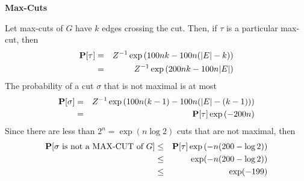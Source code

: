 \documentclass[11pt]{article} \usepackage{amssymb}
\begin{document}
{\bf Max-Cuts}

Let max-cuts of $G$ have $k$ edges crossing the cut. Then, if $\tau$ is a particular
max-cut, then
\begin{eqnarray*}
  \P[\tau]&=&Z^{-1}\exp\left(100nk-100n(|E|-k)\right)
  \\ &=& Z^{-1}\exp\left(200nk-100n|E|\right)
\end{eqnarray*}
The probability of a cut $\sigma$ that is not maximal is at most
\begin{eqnarray*}
  \P[\sigma]&=&Z^{-1}\exp\left(100n(k-1)-100n(|E|-(k-1))\right)
  \\ &=& \P[\tau]\exp\left(-200n\right)
\end{eqnarray*}
Since there are less than $2^n=\exp(n\log 2)$ cuts that are not maximal, then
\begin{eqnarray*}
  \P[\sigma\mbox{ is not a MAX-CUT of $G$}] &\leq& \P[\tau]\exp\left(-n(200-\log 2)\right)
\\ &\leq& \exp(-n(200-\log 2)) 
\\ &\leq& \exp(-199) 
\end{eqnarray*}
\end{document}
